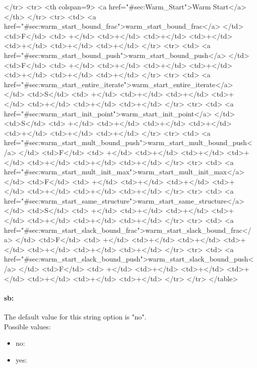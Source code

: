 {{</tr>
<tr>   <th colspan=9> <a href="#sec:Warm_Start">Warm Start</a> </th>
</tr>
<tr>
<td> <a href="#sec:warm_start_bound_frac">warm_start_bound_frac</a> </td>
<td>F</td>
<td> +</td>
<td>+</td>
<td>+</td>
<td>+</td>
<td>+</td>
<td>+</td>
<td>+</td>
</tr>
<tr>
<td> <a href="#sec:warm_start_bound_push">warm_start_bound_push</a> </td>
<td>F</td>
<td> +</td>
<td>+</td>
<td>+</td>
<td>+</td>
<td>+</td>
<td>+</td>
<td>+</td>
</tr>
<tr>
<td> <a href="#sec:warm_start_entire_iterate">warm_start_entire_iterate</a> </td>
<td>S</td>
<td> +</td>
<td>+</td>
<td>+</td>
<td>+</td>
<td>+</td>
<td>+</td>
<td>+</td>
</tr>
<tr>
<td> <a href="#sec:warm_start_init_point">warm_start_init_point</a> </td>
<td>S</td>
<td> +</td>
<td>+</td>
<td>+</td>
<td>+</td>
<td>+</td>
<td>+</td>
<td>+</td>
</tr>
<tr>
<td> <a href="#sec:warm_start_mult_bound_push">warm_start_mult_bound_push</a> </td>
<td>F</td>
<td> +</td>
<td>+</td>
<td>+</td>
<td>+</td>
<td>+</td>
<td>+</td>
<td>+</td>
</tr>
<tr>
<td> <a href="#sec:warm_start_mult_init_max">warm_start_mult_init_max</a> </td>
<td>F</td>
<td> +</td>
<td>+</td>
<td>+</td>
<td>+</td>
<td>+</td>
<td>+</td>
<td>+</td>
</tr>
<tr>
<td> <a href="#sec:warm_start_same_structure">warm_start_same_structure</a> </td>
<td>S</td>
<td> +</td>
<td>+</td>
<td>+</td>
<td>+</td>
<td>+</td>
<td>+</td>
<td>+</td>
</tr>
<tr>
<td> <a href="#sec:warm_start_slack_bound_frac">warm_start_slack_bound_frac</a> </td>
<td>F</td>
<td> +</td>
<td>+</td>
<td>+</td>
<td>+</td>
<td>+</td>
<td>+</td>
<td>+</td>
</tr>
<tr>
<td> <a href="#sec:warm_start_slack_bound_push">warm_start_slack_bound_push</a> </td>
<td>F</td>
<td> +</td>
<td>+</td>
<td>+</td>
<td>+</td>
<td>+</td>
<td>+</td>
<td>+</td>
</tr>
</tr>
</table>
}
}
\paragraph{sb:}\label{sec:sb}  $\;$ \\

The default value for this string option is "no".
\\ 
Possible values:
\begin{itemize}
   \item no: 
   \item yes: 
\end{itemize}

